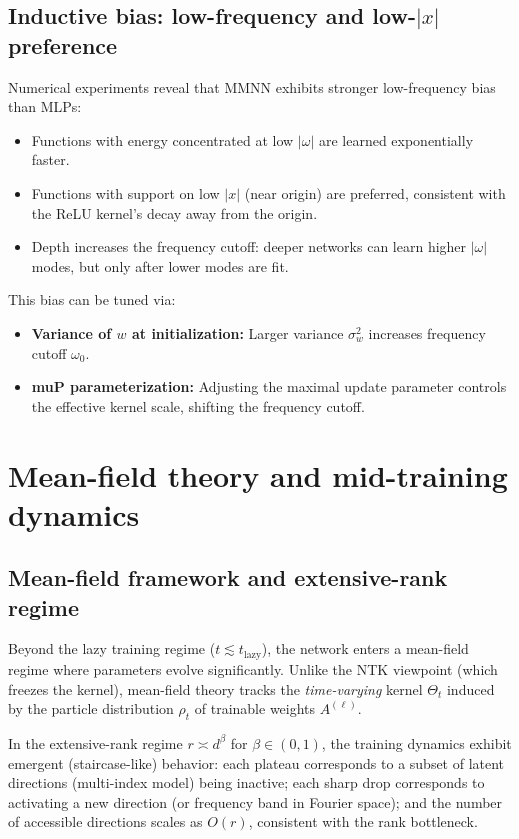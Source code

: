 \documentclass{article}
\begin{document}
\vspace{1em}
\subsection{Inductive bias: low-frequency and low-\( |x| \) preference}
Numerical experiments reveal that MMNN exhibits stronger low-frequency bias than MLPs:
\begin{itemize}
    \item Functions with energy concentrated at low \( |\omega| \) are learned exponentially faster.
    \item Functions with support on low \( |x| \) (near origin) are preferred, consistent with the ReLU kernel's decay away from the origin.
    \item Depth increases the frequency cutoff: deeper networks can learn higher \( |\omega| \) modes, but only after lower modes are fit.
\end{itemize}
This bias can be tuned via:
\begin{itemize}
    \item \textbf{Variance of \( w \) at initialization:} Larger variance \( \sigma_w^2 \) increases frequency cutoff \( \omega_0 \).
    \item \textbf{muP parameterization:} Adjusting the maximal update parameter controls the effective kernel scale, shifting the frequency cutoff.
\end{itemize}

\vspace{2em}
\section{Mean-field theory and mid-training dynamics}

\vspace{1em}
\subsection{Mean-field framework and extensive-rank regime}
Beyond the lazy training regime (\( t \lesssim t_{\text{lazy}} \)), the network enters a mean-field regime where parameters evolve significantly. Unlike the NTK viewpoint (which freezes the kernel), mean-field theory tracks the \emph{time-varying} kernel \( \Theta_t \) induced by the particle distribution \( \rho_t \) of trainable weights \( A^{(\ell)} \).

In the extensive-rank regime \( r \asymp d^\beta \) for \( \beta \in (0,1) \), the training dynamics exhibit emergent (staircase-like) behavior: each plateau corresponds to a subset of latent directions (multi-index model) being inactive; each sharp drop corresponds to activating a new direction (or frequency band in Fourier space); and the number of accessible directions scales as \( O(r) \), consistent with the rank bottleneck.
\end{document}
